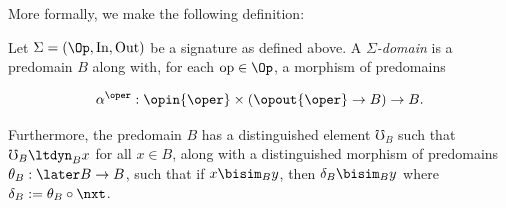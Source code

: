 \documentclass[acmsmall, screen]{acmart}
\theoremstyle{remark}
\begin{document}



More formally, we make the following definition:
%
\begin{definition}\label{def:sigma-domain} 
  
  Let $\Sigma = (\Op, \text{In}, \text{Out})$ be a signature as defined above. A
  \emph{$\Sigma$-domain} is a predomain $B$ along with, for each $\text{op} \in
  \Op$, a morphism of predomains
  
  \[ \alpha^{\oper} : \opin{\oper} \times (\opout{\oper} \to B) \to B. \]
  
  Furthermore, the predomain $B$ has a distinguished element $\mho_B$ such that
  $\mho_B \ltdyn_B x$ for all $x \in B$, along with a distinguished morphism of
  predomains $\theta_B : \later B \to B$, such that if $x \bisim_{B} y$, then
  $\delta_B \bisim_{B} y$ where $\delta_B := \theta_B \circ \nxt$.
\end{definition}
\end{document}
